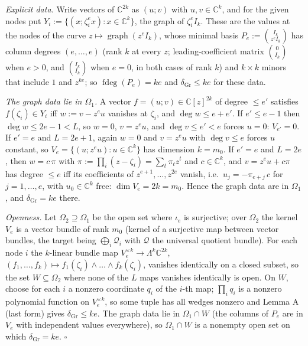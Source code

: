 \documentclass[
  11pt,
  a4paper,
]{article}
\newcounter{none} %
\begin{document}
\emph{Explicit data.} Write vectors of \(\mathbb C^{2k}\) as \((u;\allowbreak{}v)\)
with \(u,\allowbreak{}v\in\mathbb C^k\), and for the given nodes put
\(Y_i:=\{(x;\allowbreak{}\zeta_i^{e}x):x\in\mathbb C^k\}\), the graph of
\(\zeta_i^eI_k\). These are the values at the nodes of the curve
\(z\mapsto\operatorname{graph}(z^eI_k)\), whose minimal basis
\(P_e:=\binom{I_k}{z^eI_k}\) has column degrees \((e,\allowbreak{}\dots,\allowbreak{}e)\) (rank
\(k\) at every \(z\); leading-coefficient matrix \(\binom{0}{I_k}\) when
\(e>0\), and \(\binom{I_k}{I_k}\) when \(e=0\), in both cases of rank
\(k\)) and \(k\times k\) minors that include \(1\) and \(z^{ke}\); so
\(\operatorname{fdeg}(P_e)=ke\) and \(\delta_{\mathrm{Gr}}\le ke\) for
these data.

\emph{The graph data lie in \(\Omega_1\).} A vector
\(f=(u;\allowbreak{}v)\in\mathbb C[z]^{2k}\) of degree \(\le e'\) satisfies
\(f(\zeta_i)\in Y_i\) iff \(w:=v-z^eu\) vanishes at \(\zeta_i\), and
\(\deg w\le e+e'\). If \(e'\le e-1\) then \(\deg w\le2e-1<L\), so
\(w=0\), \(v=z^eu\), and \(\deg v\le e'<e\) forces \(u=0\):
\(V_{e'}=0\). If \(e'=e\) and \(L=2e+1\), again \(w=0\) and \(v=z^eu\)
with \(\deg v\le e\) forces \(u\) constant, so
\(V_e=\{(u;\allowbreak{}z^eu):u\in\mathbb C^k\}\) has dimension \(k=m_0\). If
\(e'=e\) and \(L=2e\), then \(w=c\,\allowbreak{}\pi\) with
\(\pi:=\prod_i(z-\zeta_i)=\sum_t\pi_tz^t\) and \(c\in\mathbb C^k\), and
\(v=z^eu+c\pi\) has degree \(\le e\) iff its coefficients of
\(z^{e+1},\allowbreak{}\dots,\allowbreak{}z^{2e}\) vanish, i.e.~\(u_j=-\pi_{e+j}\,\allowbreak{}c\) for
\(j=1,\allowbreak{}\dots,\allowbreak{}e\), with \(u_0\in\mathbb C^k\) free: \(\dim V_e=2k=m_0\).
Hence the graph data are in \(\Omega_1\), and
\(\delta_{\mathrm{Gr}}=ke\) there.

\emph{Openness.} Let \(\Omega_2\supseteq\Omega_1\) be the open set where
\(\iota_e\) is surjective; over \(\Omega_2\) the kernel \(V_e\) is a
vector bundle of rank \(m_0\) (kernel of a surjective map between vector
bundles, the target being \(\bigoplus_i\mathcal Q_i\) with
\(\mathcal Q\) the universal quotient bundle). For each node \(i\) the
\(k\)-linear bundle map \(V_e^{\times k}\to\Lambda^k\mathbb C^{2k}\),
\((f_1,\allowbreak{}\dots,\allowbreak{}f_k)\mapsto f_1(\zeta_i)\wedge\dots\wedge f_k(\zeta_i)\),
vanishes identically on a closed subset, so the set
\(W\subseteq\Omega_2\) where none of the \(L\) maps vanishes identically
is open. On \(W\), choose for each \(i\) a nonzero coordinate \(q_i\) of
the \(i\)-th map; \(\prod_iq_i\) is a nonzero polynomial function on
\(V_e^{\times k}\), so some tuple has all wedges nonzero and Lemma A
(last form) gives \(\delta_{\mathrm{Gr}}\le ke\). The graph data lie in
\(\Omega_1\cap W\) (the columns of \(P_e\) are in \(V_e\) with
independent values everywhere), so \(\Omega_1\cap W\) is a nonempty open
set on which \(\delta_{\mathrm{Gr}}=ke\). \(\square\)
\end{document}
